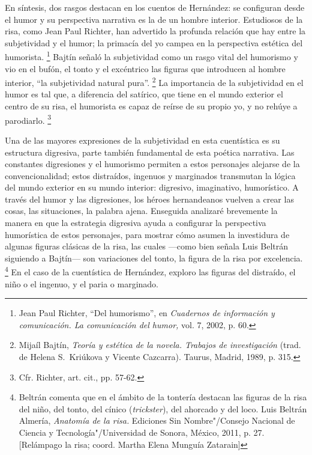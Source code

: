 \documentclass[14pt,twoside,final]{extbook} %
\let\oldfootnote\footnote
\renewcommand\footnote[1]{%
\oldfootnote{\hspace{1mm}#1}}
\begin{document}
En síntesis, dos rasgos destacan en los cuentos de Hernández: se configuran desde el humor y su perspectiva narrativa es la de un hombre interior. Estudiosos de la risa, como Jean Paul Richter, han advertido la profunda relación que hay entre la subjetividad y el humor; la primacía del yo campea en la perspectiva estética del humorista.\footnote{Jean Paul Richter, ``Del humorismo'', en \emph{Cuadernos de información y comunicación. La comunicación del humor,} vol. 7, 2002, p. 60.} Bajtín señaló la subjetividad como un rasgo vital del humorismo y vio en el bufón, el tonto y el excéntrico las figuras que introducen al hombre interior, ``la subjetividad natural pura''.\footnote{Mijaíl Bajtín, \emph{Teoría y estética de la novela. Trabajos de investigación} (trad. de Helena S.~Kriúkova y Vicente Cazcarra). Taurus, Madrid, 1989, p. 315.} La importancia de la subjetividad en el humor es tal que, a diferencia del satírico, que tiene en el mundo exterior el centro de su risa, el humorista es capaz de reírse de su propio yo, y no rehúye a parodiarlo.\footnote{Cfr. Richter, art. cit., pp. 57-62.}

Una de las mayores expresiones de la subjetividad en esta cuentística es su estructura digresiva, parte también fundamental de esta poética narrativa. Las constantes digresiones y el humorismo permiten a estos personajes alejarse de la convencionalidad; estos distraídos, ingenuos y marginados transmutan la lógica del mundo exterior en su mundo interior: digresivo, imaginativo, humorístico. A través del humor y las digresiones, los héroes hernandeanos vuelven a crear las cosas, las situaciones, la palabra ajena. Enseguida analizaré brevemente la manera en que la estrategia digresiva ayuda a configurar la perspectiva humorística de estos personajes, para mostrar cómo asumen la investidura de algunas figuras clásicas de la risa, las cuales ---como bien señala Luis Beltrán siguiendo a Bajtín--- son variaciones del tonto, la figura de la risa por excelencia.\footnote{Beltrán comenta que en el ámbito de la tontería destacan las figuras de la risa del niño, del tonto, del cínico (\emph{trickster}), del ahorcado y del loco. Luis Beltrán Almería, \emph{Anatomía de la risa.} Ediciones Sin Nombre"/Consejo Nacional de Ciencia y Tecnología"/Universidad de Sonora, México, 2011, p. 27. [Relámpago la risa; coord. Martha Elena Munguía Zatarain]} En el caso de la cuentística de Hernández, exploro las figuras del distraído, el niño o el ingenuo, y el paria o marginado.
\end{document}
